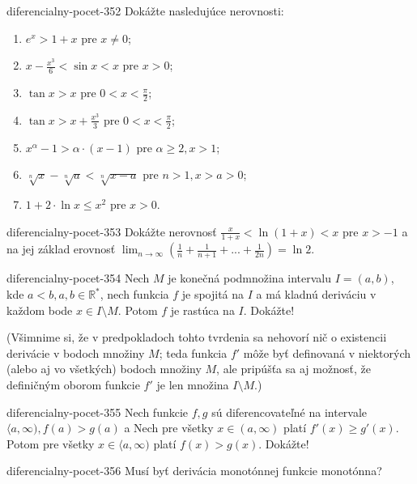 \begin{defproblem}{diferencialny-pocet-352}
Dokážte nasledujúce nerovnosti:
\begin{enumerate}
\item $e^x>1+x$ pre $x\neq 0$;
\item $x-\frac{x^3}{6}<\sin x<x$ pre $x>0$;
\item $\tan x>x$ pre $0<x<\frac{\pi}{2}$;
\item $\tan x>x+\frac{x^3}{3}$ pre $0<x<\frac{\pi}{2}$;
\item $x^{\alpha}-1>\alpha\cdot(x-1)$ pre $\alpha\geq 2,x>1$;
\item $\sqrt[n]{x}-\sqrt[n]{a}<\sqrt[n]{x-a}$ pre $n>1,x>a>0$;
\item $1+2\cdot\ln x\leq x^2$ pre $x>0$.
\end{enumerate}
\end{defproblem}

\begin{defproblem}{diferencialny-pocet-353}
Dokážte nerovnosť $\frac{x}{1+x}<\ln (1+x)<x$ pre $x>-1$ a na jej základ erovnosť $\lim_{n \rightarrow \infty}(\frac{1}{n}+\frac{1}{n+1}+...+\frac{1}{2n})=\ln 2$.
\end{defproblem}

\begin{defproblem}{diferencialny-pocet-354}
Nech $M$ je konečná podmnožina intervalu $I=(a,b)$, kde $a<b,a,b\in\mathbb{R^*}$, nech funkcia $f$ je spojitá na $I$ a má kladnú deriváciu v každom bode $x\in I \setminus M$. Potom $f$ je rastúca na $I$. Dokážte!

(Všimnime si, že v predpokladoch tohto tvrdenia sa nehovorí nič o existencii derivácie v bodoch množiny $M$; teda funkcia $f'$ môže byť definovaná v niektorých (alebo aj vo všetkých) bodoch množiny $M$, ale pripúšťa sa aj možnosť, že definičným oborom funkcie $f'$ je len množina $I \setminus M$.)
\end{defproblem}

\begin{defproblem}{diferencialny-pocet-355}
Nech funkcie $f,g$ sú diferencovateľné na intervale $\langle a,\infty),f(a)>g(a)$ a Nech pre všetky $x\in (a,\infty)$ platí $f'(x)\geq g'(x)$. Potom pre všetky $x\in \langle a,\infty)$ platí $f(x)>g(x)$. Dokážte!
\end{defproblem}

\begin{defproblem}{diferencialny-pocet-356}
Musí byť derivácia monotónnej funkcie monotónna?
\end{defproblem}

